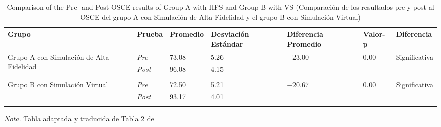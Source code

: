 \begin{table}[H]
   \caption{Comparison of the Pre- and Post-OSCE results of Group A with HFS and Group B with VS (Comparación de los resultados pre y post al OSCE del grupo A con Simulación de Alta Fidelidad y el grupo B con Simulación Virtual)}
   \label{tab:tabla-enfermeros}
   \begin{center}
      \begin{tabular}{ p{3cm} p{1cm} p{2cm} p{2cm} p{2cm} p{1cm} p{1cm} }
         \hline
         Grupo & Prueba & Promedio & Desviación Estándar & Diferencia Promedio & Valor-p & Diferencia \\
         \hline
         \multirow{2}{3cm}{Grupo A con Simulación de Alta Fidelidad} & \textit{Pre}  & 73.08 & 5.26 & $-23.00$ & 0.00 & Significativa \\
                                             & \textit{Post} & 96.08 & 4.15 & ~      & ~    & ~            \\
                                             \\
         \multirow{2}{3cm}{Grupo B con Simulación Virtual}  & \textit{Pre}  & 72.50 & 5.21 & $-20.67$ & 0.00 & Significativa \\
                                             & \textit{Post} & 93.17 & 4.01 \\
                                             \\
         \hline
      \end{tabular}
   \end{center}
   \textit{Nota.} Tabla adaptada y traducida de Tabla 2 de \cite{GUERRERO2022100002}
\end{table}
